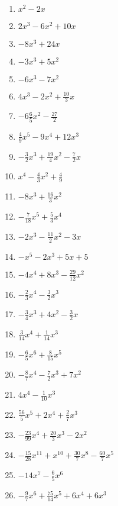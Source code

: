 \newpage
\begin{Answer}[ref=aufloesenA1]\\
	\begin{minipage}{\textwidth}
		\begin{minipage}{0.44\textwidth}
			\begin{enumerate}[label=\alph*)]
				\item \(x^2-2x\)
				\item \(2x^3-6x^2+10x\)
				\item \(-8x^3+24x\)
				\item \(-3x^3+5x^2\)
				\item \(-6x^3-7x^2\)
				\item \(4x^3-2x^2+\frac{10}{3}x\)
				\item \(-6\frac{6}{5}x^2-\frac{27}{2}\)
				\item \(\frac{4}{9}x^5-9x^4+12x^3\)
				\item \(-\frac{3}{2}x^3+\frac{19}{4}x^2-\frac{7}{2}x\)
				\item \(x^4-\frac{4}{3}x^2+\frac{4}{9}\)
				\item \(-8x^3+\frac{16}{3}x^2\)
				\item \(-\frac{7}{18}x^5+\frac{5}{3}x^4\)
				\item \(-2x^3-\frac{11}{2}x^2-3x\)
			\end{enumerate}
		\end{minipage}
		\begin{minipage}{0.54\textwidth}
			\begin{enumerate}[label=\alph*)]
				\setcounter{enumi}{13}
				\item \(-x^5-2x^3+5x+5\)
				\item \(-4x^4+8x^3-\frac{29}{12}x^2\)
				\item \(-\frac{2}{3}x^4-\frac{3}{2}x^3\)
				\item \(-\frac{3}{4}x^3+4x^2-\frac{3}{2}x\)
				\item \(\frac{3}{14}x^4+\frac{1}{14}x^3\)
				\item \(-\frac{6}{5}x^6+\frac{8}{15}x^5\)
				\item \(-\frac{8}{7}x^4-\frac{7}{2}x^3+7x^2\)
				\item \(4x^4-\frac{1}{10}x^3\)
				\item \(\frac{56}{5}x^5+2x^4+\frac{2}{7}x^3\)
				\item \(-\frac{23}{99}x^4+\frac{20}{3}x^3-2x^2\)
				\item \(-\frac{15}{28}x^{11}+x^{10}+\frac{30}{7}x^8-\frac{60}{7}x^5\)
				\item \(-14x^7-\frac{6}{5}x^6\)
				\item \(-\frac{9}{7}x^6+\frac{75}{14}x^5+6x^4+6x^3\)
			\end{enumerate}
		\end{minipage}
	\end{minipage}
\end{Answer}
